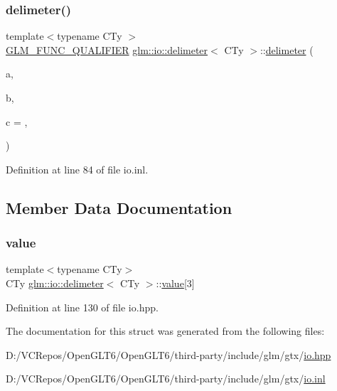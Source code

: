 \subsubsection{\texorpdfstring{delimeter()}{delimeter()}}
{\footnotesize\ttfamily template$<$typename C\+Ty $>$ \\
\mbox{\hyperlink{setup_8hpp_a33fdea6f91c5f834105f7415e2a64407}{G\+L\+M\+\_\+\+F\+U\+N\+C\+\_\+\+Q\+U\+A\+L\+I\+F\+I\+ER}} \mbox{\hyperlink{structglm_1_1io_1_1delimeter}{glm\+::io\+::delimeter}}$<$ C\+Ty $>$\+::\mbox{\hyperlink{structglm_1_1io_1_1delimeter}{delimeter}} (\begin{DoxyParamCaption}\item[{C\+Ty}]{a,  }\item[{C\+Ty}]{b,  }\item[{C\+Ty}]{c = {\ttfamily \textquotesingle{},\textquotesingle{}} }\end{DoxyParamCaption})\hspace{0.3cm}{\ttfamily [explicit]}}



Definition at line 84 of file io.\+inl.



\subsection{Member Data Documentation}
\mbox{\label{structglm_1_1io_1_1delimeter_a9ade129dae50c4f716f724e7425f9c68}} 
\subsubsection{\texorpdfstring{value}{value}}
{\footnotesize\ttfamily template$<$typename C\+Ty$>$ \\
C\+Ty \mbox{\hyperlink{structglm_1_1io_1_1delimeter}{glm\+::io\+::delimeter}}$<$ C\+Ty $>$\+::\mbox{\hyperlink{glad_8h_a03aff08f73d7fde3d1a08e0abd8e84fa}{value}}\mbox{[}3\mbox{]}}



Definition at line 130 of file io.\+hpp.



The documentation for this struct was generated from the following files\+:\begin{DoxyCompactItemize}
\item 
D\+:/\+V\+C\+Repos/\+Open\+G\+L\+T6/\+Open\+G\+L\+T6/third-\/party/include/glm/gtx/\mbox{\hyperlink{io_8hpp}{io.\+hpp}}\item 
D\+:/\+V\+C\+Repos/\+Open\+G\+L\+T6/\+Open\+G\+L\+T6/third-\/party/include/glm/gtx/\mbox{\hyperlink{io_8inl}{io.\+inl}}\end{DoxyCompactItemize}
